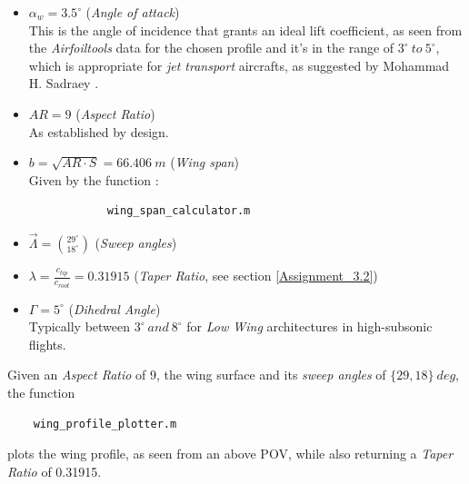\documentclass{article}
\begin{document}
\begin{itemize}
    \item $\alpha_w = 3.5^{\circ}$ (\textit{Angle of attack}) \\ 
        This is the angle of incidence that grants an ideal lift coefficient, as seen from the \textit{Airfoiltools}
        \autocite{Airfoiltools} data for the chosen profile and it's in the range of $3^{\circ} \ to \ 5^{\circ}$, 
        which is appropriate for \textit{jet transport} aircrafts, as suggested by Mohammad H. Sadraey \autocite{Sadraey_Mohammad}.
    \item $AR = 9$ (\textit{Aspect Ratio}) \\ 
        As established by design. 
    \item $b = \sqrt{AR \cdot S} = 66.406 \ m$ (\textit{Wing span}) \\ 
        Given by the function \autocite{Airbus_replacement_repo}: 

        \begin{verbatim}
            wing_span_calculator.m
        \end{verbatim}
    \item $\vec{\Lambda} = \binom{29^{\circ}}{18^{\circ}}$ (\textit{Sweep angles})
    \item $\lambda = \frac{c_{tip}}{c_{root}} = 0.31915$ (\textit{Taper Ratio}, see section \ref{Assignment_3.2})
    \item $\Gamma = 5^{\circ}$ (\textit{Dihedral Angle}) \\
        Typically between $3^{\circ} \ and \ 8^{\circ}$ for \textit{Low Wing} architectures in 
        high-subsonic flights.
\end{itemize}
\clearpage 

Given an \textit{Aspect Ratio} of 9, the wing surface and its \textit{sweep angles} of $ \{29, 18 \} \ deg$,
the function 
\begin{verbatim}
    wing_profile_plotter.m
\end{verbatim}
plots the wing profile, as seen from an above POV, while also returning a \textit{Taper Ratio} of 0.31915.\\ 
\end{document}
